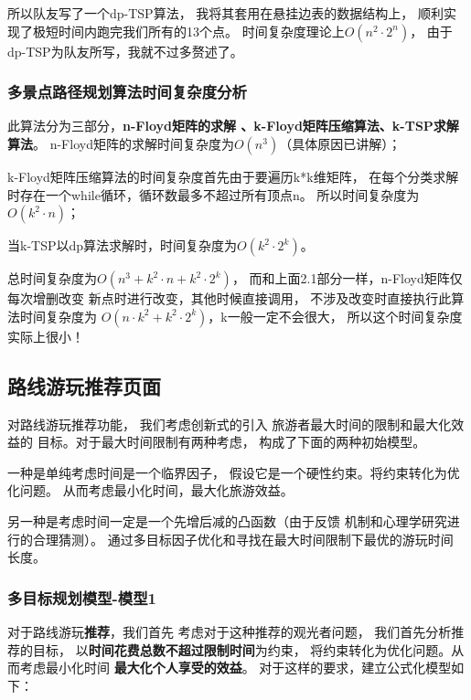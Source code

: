 \documentclass[withoutpreface,bwprint]{cumcmthesis} %
\begin{document}
所以队友写了一个dp-TSP算法，
我将其套用在悬挂边表的数据结构上，
顺利实现了极短时间内跑完我们所有的13个点。
时间复杂度理论上$O(n^2 \cdot 2^n)$，
由于dp-TSP为队友所写，我就不过多赘述了。

\subsubsection{多景点路径规划算法时间复杂度分析}

此算法分为三部分，\textbf{n-Floyd矩阵的求解
、k-Floyd矩阵压缩算法、k-TSP求解算法}。
n-Floyd矩阵的求解时间复杂度为$O(n^3)$（具体原因已讲解）；

k-Floyd矩阵压缩算法的时间复杂度首先由于要遍历k*k维矩阵，
在每个分类求解时存在一个while循环，循环数最多不超过所有顶点n。
所以时间复杂度为$O(k^2\cdot n)$；

当k-TSP以dp算法求解时，时间复杂度为$O(k^2\cdot 2^k)$。

总时间复杂度为$O(n^3+k^2\cdot n+k^2\cdot 2^k)$，
而和上面2.1部分一样，n-Floyd矩阵仅每次增删改变
新点时进行改变，其他时候直接调用，
不涉及改变时直接执行此算法时间复杂度为
$O(n\cdot k^2+k^2\cdot 2^k)$，k一般一定不会很大，
所以这个时间复杂度实际上很小！

\subsection{路线游玩推荐页面}

对路线游玩推荐功能，
我们考虑创新式的引入
旅游者最大时间的限制和最大化效益的
目标。对于最大时间限制有两种考虑，
构成了下面的两种初始模型。

一种是单纯考虑时间是一个临界因子，
假设它是一个硬性约束。将约束转化为优化问题。
从而考虑最小化时间，最大化旅游效益。

另一种是考虑时间一定是一个先增后减的凸函数（由于反馈
机制和心理学研究进行的合理猜测）。
通过多目标因子优化和寻找在最大时间限制下最优的游玩时间
长度。


\subsubsection{多目标规划模型-模型1}
对于路线游玩\textbf{推荐}，我们首先
考虑对于这种推荐的观光者问题，
我们首先分析推荐的目标，
以\textbf{时间花费总数不超过限制时间}为约束，
将约束转化为优化问题。从而考虑最小化时间
\textbf{最大化个人享受的效益}。
对于这样的要求，建立公式化模型如下：
\end{document}
